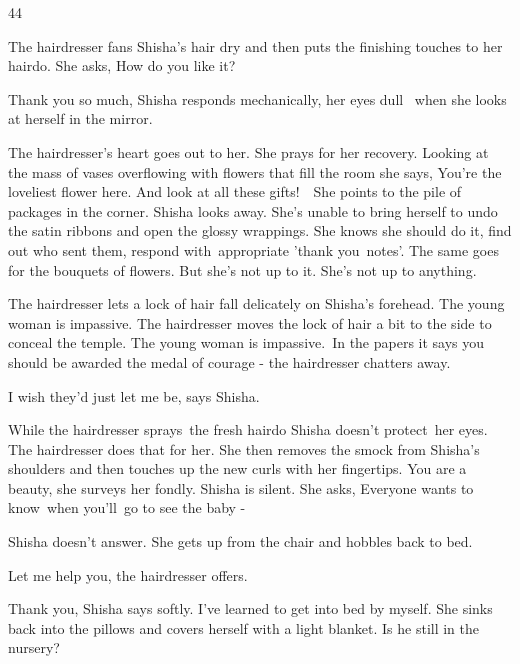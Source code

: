 \documentclass[letterpaper]{article}
\begin{document}
44 

The hairdresser fans Shisha's hair dry and then puts the finishing touches to her hairdo. She asks, {\textquotedbl}How
do you like it?{\textquotedbl} 

{\textquotedbl}Thank you so much,{\textquotedbl} Shisha responds mechanically, her eyes dull ~when she looks at herself
in the mirror. 

The hairdresser's heart goes out to her. She prays for her recovery. Looking at the mass of vases overflowing with
flowers that fill the room she says, {\textquotedbl}You're the loveliest flower here. And look at all these
gifts!{\textquotedbl}\ \ She points to the pile of packages in the corner. Shisha looks away. She's unable to bring
herself to undo the satin ribbons and open the glossy wrappings. She knows she should do it, find out who sent them,
respond with~appropriate {}'thank you\ notes{}'. The same goes for the bouquets of flowers. But she's not up to it.
She's not up to anything. 

The hairdresser lets a lock of hair fall delicately on Shisha's forehead. The young woman is impassive. The hairdresser
moves the lock of hair a bit to the side to conceal the temple. The young woman is
impassive.\textcolor[rgb]{0.0,0.4392157,0.7529412}{\ }{\textquotedbl}In the papers it says you should be awarded the
medal of courage -{\textquotedbl} the hairdresser chatters away. 

{\textquotedbl}I wish they'd just let me be,{\textquotedbl} says Shisha\textcolor[rgb]{0.0,0.4392157,0.7529412}{.}

While the hairdresser sprays\ the fresh hairdo Shisha doesn't protect\textcolor[rgb]{0.0,0.4392157,0.7529412}{\ }her
eyes. The hairdresser does that for her. She then removes the smock from Shisha's shoulders and then touches up the new
curls with her fingertips. {\textquotedbl}You are a beauty,{\textquotedbl} she surveys her fondly. Shisha is silent.
She asks, {\textquotedbl}Everyone wants to know\ when you'll~go to see the baby - {\textquotedbl} 

Shisha doesn't answer. She gets up from the chair and hobbles back to bed. 

{\textquotedbl}Let me help you,{\textquotedbl} the hairdresser offers.

{\textquotedbl}Thank you,{\textquotedbl} Shisha says softly. {\textquotedbl}I've learned to get into bed by
myself.{\textquotedbl} She sinks back into the pillows and covers herself with a light blanket. {\textquotedbl}Is he
still in the nursery?{\textquotedbl}\ \ 
\end{document}
